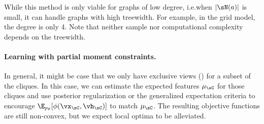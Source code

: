 
While this method is only viable for graphs of low degree, i.e.\@ when $|\sN(a)|$ is small,
it can handle graphs with high treewidth.
For example, in the grid model, the degree is only 4.
Note that neither sample nor computational complexity depends on the treewidth.

\paragraph{Learning with partial moment constraints.}

In general, it might be case that we only have exclusive views () for a subset of the cliques.
In this case, we can estimate the expected features $\mu_\sC$ for those cliques
  and use posterior regularization \citep{graca08em} or the generalized expectation criteria \citep{mann08ge}
  to encourage $\E_{p_\theta}[\phi(\vx_\sC,\vh_\sC)]$ to match $\mu_\sC$.
The resulting objective functions are still non-convex, but we expect
  local optima to be alleviated. 



